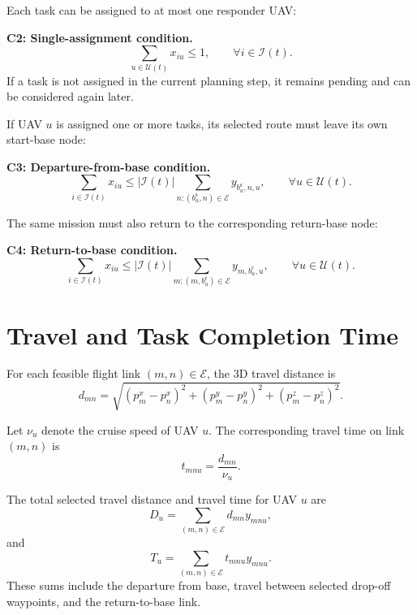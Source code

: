 Each task can be assigned to at most one responder UAV:

\noindent\textbf{C2: Single-assignment condition.}
\begin{equation*}
\sum_{u\in\mathcal{U}(t)}
x_{iu}
\leq 1,
\qquad
\forall i\in\mathcal{I}(t).
\end{equation*}
If a task is not assigned in the current planning step, it remains pending and
can be considered again later.

If UAV $u$ is assigned one or more tasks, its selected route must leave its
own start-base node:

\noindent\textbf{C3: Departure-from-base condition.}
\begin{equation*}
\sum_{i\in\mathcal{I}(t)}
x_{iu}
\leq
|\mathcal{I}(t)|
\sum_{n:(b_u^{\mathrm{s}},n)\in\mathcal{E}}
y_{b_u^{\mathrm{s}},n,u},
\qquad
\forall u\in\mathcal{U}(t).
\end{equation*}

The same mission must also return to the corresponding return-base node:

\noindent\textbf{C4: Return-to-base condition.}
\begin{equation*}
\sum_{i\in\mathcal{I}(t)}
x_{iu}
\leq
|\mathcal{I}(t)|
\sum_{m:(m,b_u^{\mathrm{r}})\in\mathcal{E}}
y_{m,b_u^{\mathrm{r}},u},
\qquad
\forall u\in\mathcal{U}(t).
\end{equation*}

\section{Travel and Task Completion Time}

For each feasible flight link $(m,n)\in\mathcal{E}$, the 3D travel distance is
\begin{equation}
d_{mn}
=
\sqrt{
(p_m^x-p_n^x)^2
+
(p_m^y-p_n^y)^2
+
(p_m^z-p_n^z)^2
}.
\end{equation}

Let $\nu_u$ denote the cruise speed of UAV $u$. The corresponding travel time
on link $(m,n)$ is
\begin{equation}
t_{mnu}
=
\frac{d_{mn}}{\nu_u}.
\end{equation}

The total selected travel distance and travel time for UAV $u$ are
\begin{equation}
D_u
=
\sum_{(m,n)\in\mathcal{E}}
d_{mn}y_{mnu},
\end{equation}
and
\begin{equation}
T_u
=
\sum_{(m,n)\in\mathcal{E}}
t_{mnu}y_{mnu}.
\end{equation}
These sums include the departure from base, travel between selected drop-off
waypoints, and the return-to-base link.

